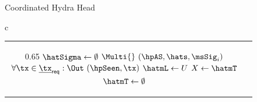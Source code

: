 \begin{figure}[t!]
\begin{algobox}{Coordinated Hydra Head}
\begin{tabular}{c}
\begin{tabular}{c@{}c}
{\begin{walgo}{0.65}
{{								$\hatSigma \gets \emptyset$ \;
								$\Multi{}~(\hpAS,\hats,\msSig_i)$ \;
								$\forall \tx \in \underline{\tx}_{\mathsf{req}}: \Out~(\hpSeen,\tx)$ \;
								$\hatmL \gets U$ \;
								$X\gets\hatmT$ \;
								$\hatmT\gets\emptyset$ \;
								\For{$\tx\in X : \hatmL\applytx \tx \not=\bot$}{
									$\hatmT\gets\hatmT\cup\{\tx\}$ \;
									$\hatmL\gets\hatmL\applytx \tx$ \;
								}
							}
						}
						\vspace{12pt}
					\end{walgo}
				} &

				\adjustbox{valign=t,scale=\sfact}{
					\begin{walgo}{0.7}
						\On{$(\hpAS,s,\msSig_j)$ from $\party_j$}{
							\Req{} $s \in \{\hats,\hats+1\}$ \;
							\Wait{$\hats=s$}{
								\Req{} $(j, \cdot) \notin \hatSigma$ \;
								$\hatSigma[j] \gets \sigma_{j}$ \;
								\If{$\forall k \in [1..n]: (k,\cdot) \in \hatSigma$}{
									$\msCSig \gets \msComb(\hydraKeys^{setup}, \hatSigma)$ \;

									$\eta' \gets \accUTxO(\hatmU)$ \;
									${\eta'}^{\#} \gets (\eta')^{\#}$ \;
									\Req{} $\msVfy(\hydraKeysAgg, (\cid || \hatv || \hats || {\eta'}^{\#}), \msCSig)$ \;
									$\bar{\mc S} \gets \Sno(\hatv, \hats, \hatmT, \hatmU, U_\alpha, U_\omega)$ \;
									$\bar{\mc S}.\sigma \gets \msCSig$ \;
									$\forall \tx \in \mT_{\mathsf{req}} : \Out (\hpConf,\tx)$ \;

									\If{${\bar S}.U_\omega \ne \bot$}{
										$\PostTx{}~(\mathtt{decrementTx}, \hatv, \hats, {\eta'}^{\#}, \bar{\mc S}.\sigma)$ \;
									}

									\If{${\bar S}.U_\alpha \ne \bot$}{
										$\PostTx{}~(\mathtt{incrementTx}, \hatv, \hats, {\eta'}^{\#}, \bar{\mc S}.\sigma)$ \;
									}

									\If{$\hpLdr(s+1) = i \land \hatmT \neq \emptyset$}{
										\If{$\tx_\alpha = \bot \land \tx_\omega = \bot \land \bar{\mc S}.U_\alpha = \emptyset$}{
											$\tx_\alpha \gets $ oldest $D \in \mathcal{D}$ with $D.\mathsf{status} = \mathsf{Active}$ \;
										}
										\Multi{} $(\hpRS,\hatv,\bar{\mc S}.s+1,\hatmT,\tx_\alpha,\tx_\omega)$ \;
									}
								}
							}
						}
						\vspace{12pt}


\end{walgo}}
\end{tabular}
\end{tabular}
\end{algobox}
\end{figure}
